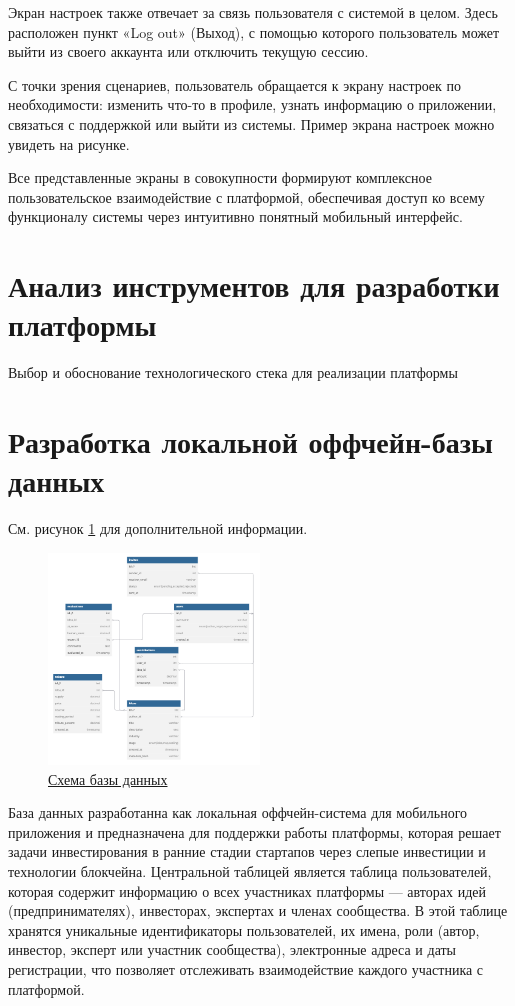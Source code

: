 \documentclass[
    candidate, %
    subf, %
    dotsinheaders=false,
]{disser}
\begin{document}
Экран настроек также отвечает за связь пользователя с системой в целом. Здесь расположен пункт «Log out» (Выход), с помощью которого пользователь может выйти из своего аккаунта или отключить текущую сессию.

С точки зрения сценариев, пользователь обращается к экрану настроек по необходимости: изменить что-то в профиле, узнать информацию о приложении, связаться с поддержкой или выйти из системы. Пример экрана настроек можно увидеть на рисунке.

Все представленные экраны в совокупности формируют комплексное пользовательское взаимодействие с платформой, обеспечивая доступ ко всему функционалу системы через интуитивно понятный мобильный интерфейс.

\section{Анализ инструментов для разработки платформы}
Выбор и обоснование технологического стека для реализации платформы


\section{Разработка локальной оффчейн-базы данных}

См. рисунок \ref{fig:database} для дополнительной информации.

\begin{figure}[h]
  \centering
  \includegraphics[width=0.5\textwidth]{./assets/database.png}
  \caption{{\protect\hyperlink{figref:database}{Схема базы данных}}}
  \label{fig:database}
\end{figure}

База данных разработанна как локальная оффчейн-система для мобильного приложения и предназначена для поддержки работы платформы, которая решает задачи инвестирования в ранние стадии стартапов через слепые инвестиции и технологии блокчейна. Центральной таблицей является таблица пользователей, которая содержит информацию о всех участниках платформы — авторах идей (предпринимателях), инвесторах, экспертах и членах сообщества. В этой таблице хранятся уникальные идентификаторы пользователей, их имена, роли (автор, инвестор, эксперт или участник сообщества), электронные адреса и даты регистрации, что позволяет отслеживать взаимодействие каждого участника с платформой.
\end{document}
